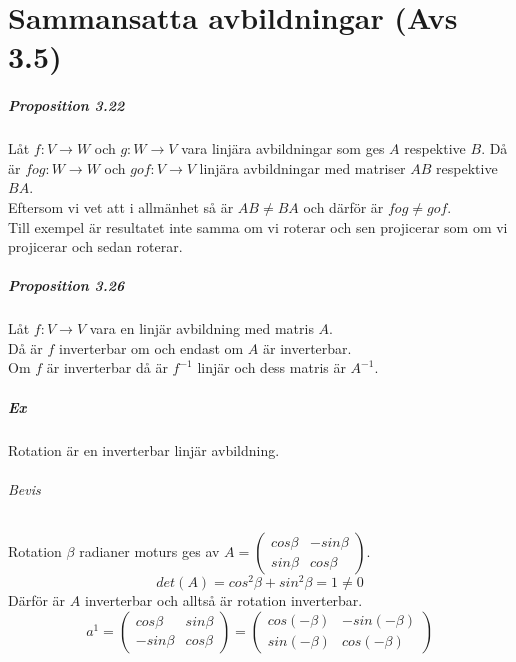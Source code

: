 \chapter{Sammansatta avbildningar (Avs 3.5)}
\paragraph{Proposition 3.22} Låt $f:V\rightarrow W$ och $g:W\rightarrow V$ vara linjära avbildningar som ges $A$ respektive $B$.
Då är $fog:W\rightarrow W$ och $gof:V\rightarrow V$ linjära avbildningar med matriser $AB$ respektive $BA$.\\
Eftersom vi vet att i allmänhet så är $AB\neq BA$ och därför är $fog\neq gof$.\\
Till exempel är resultatet inte samma om vi roterar och sen projicerar som om vi projicerar och sedan roterar.

\paragraph{Proposition 3.26} Låt $f:V\rightarrow V$ vara en linjär avbildning med matris $A$.\\
Då är $f$ inverterbar om och endast om $A$ är inverterbar.\\
Om $f$ är inverterbar då är $f^{-1}$ linjär och dess matris är $A^{-1}$.

\paragraph{Ex} Rotation är en inverterbar linjär avbildning.
\subparagraph{Bevis} Rotation $\beta$ radianer moturs ges av $A=\begin{pmatrix}cos\beta & -sin\beta\\sin\beta & cos\beta\end{pmatrix}$.
\begin{equation*}
    det(A)=cos^{2}\beta + sin^{2}\beta=1\neq 0
\end{equation*}
Därför är $A$ inverterbar och alltså är rotation inverterbar.
\begin{equation*}
    a^{1}=\begin{pmatrix}
        cos\beta&sin\beta\\-sin\beta&cos\beta
    \end{pmatrix}=\begin{pmatrix}
        cos(-\beta)&-sin(-\beta)\\sin(-\beta)&cos(-\beta)
    \end{pmatrix}
\end{equation*}